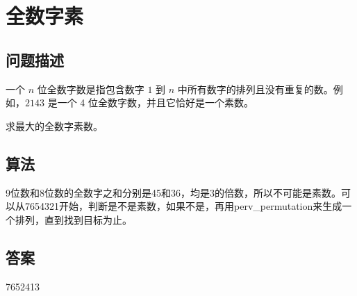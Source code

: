\section{全数字素}
\subsection{问题描述}
\begin{tcolorbox}
一个 $n$ 位全数字数是指包含数字 $1$ 到 $n$ 中所有数字的排列且没有重复的数。例如，$2143$ 是一个 4 位全数字数，并且它恰好是一个素数。

求最大的全数字素数。
\end{tcolorbox}

\subsection{算法}
9位数和8位数的全数字之和分别是45和36，均是3的倍数，所以不可能是素数。可以从7654321开始，判断是不是素数，如果不是，再用perv\_permutation来生成一个排列，直到找到目标为止。

\subsection{答案}
7652413

